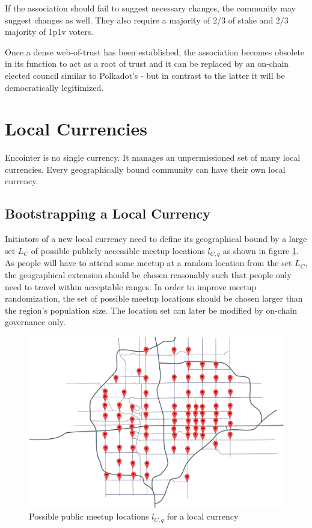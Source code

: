 \documentclass[conference]{IEEEtran}
\begin{document}
If the \encointer association should fail to suggest necessary changes, the community may suggest changes as well. They also require a majority of 2/3 of stake and 2/3 majority of 1p1v voters.

Once a dense web-of-trust has been established, the association becomes obsolete in its function to act as a root of trust and it can be replaced by an on-chain elected council similar to Polkadot's - but in contrast to the latter it will be democratically legitimized.

\section{Local Currencies}
Encointer is no single currency. It manages an unpermissioned set of many local currencies. Every geographically bound community can have their own local currency.

\subsection{Bootstrapping a Local Currency}
Initiators of a new local \encointer currency need to define its geographical bound by a large set $L_C$ of possible publicly accessible meetup locations $l_{C,q}$ as shown in figure \ref{fig:map}. As people will have to attend some meetup at a random location from the set $L_C$, the geographical extension should be chosen reasonably such that people only need to travel within acceptable ranges. In order to improve meetup randomization, the set of possible meetup locations should be chosen larger than the region's population size. The location set can later be modified by on-chain governance only. 

\begin{figure}
	\centering
	\def\svgwidth{\columnwidth}
	\includegraphics[width=\columnwidth]{meetup_locations_map.pdf}
	\caption{Possible public meetup locations $l_{C,q}$ for a local currency}
	\label{fig:map}
\end{figure}
\end{document}
